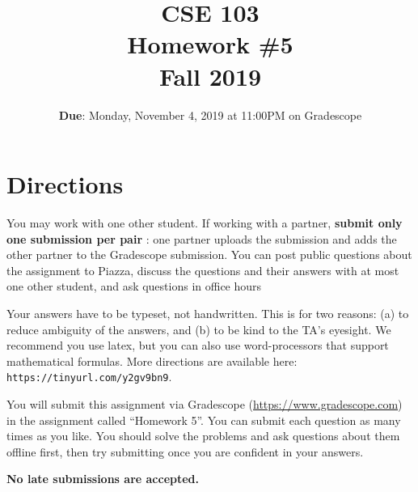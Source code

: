 \documentclass[12pt, oneside]{article}
\title{\bf CSE 103 \\[2ex]
       \Large Homework \#5\\ Fall 2019}
\begin{document}
\date{\textbf{Due}: Monday, November 4, 2019 at 11:00PM on Gradescope}
\maketitle

\section{Directions}
You may work with one other student. If working with a partner,
\textbf{submit only one submission per pair} : one partner uploads the submission and adds the other partner to the Gradescope submission. You can post public questions about the assignment to Piazza, discuss the questions and their answers with at most one other student, and ask questions in office hours

Your answers have to be typeset, not handwritten. This is for two
reasons: (a) to reduce ambiguity of the answers, and (b) to be kind to
the TA's eyesight. We recommend you use latex, but you can also use
word-processors that support mathematical formulas. More directions
are available here: {\tt https://tinyurl.com/y2gv9bn9}.

You will submit this assignment via Gradescope
(\url{https://www.gradescope.com}) in the assignment called ``Homework
5''. You can submit each question as many times as you like. You should solve the problems and ask questions about them offline first, then try submitting once you are confident in your answers. 

\textbf{No late submissions are accepted.}

  \newpage
\end{document}
